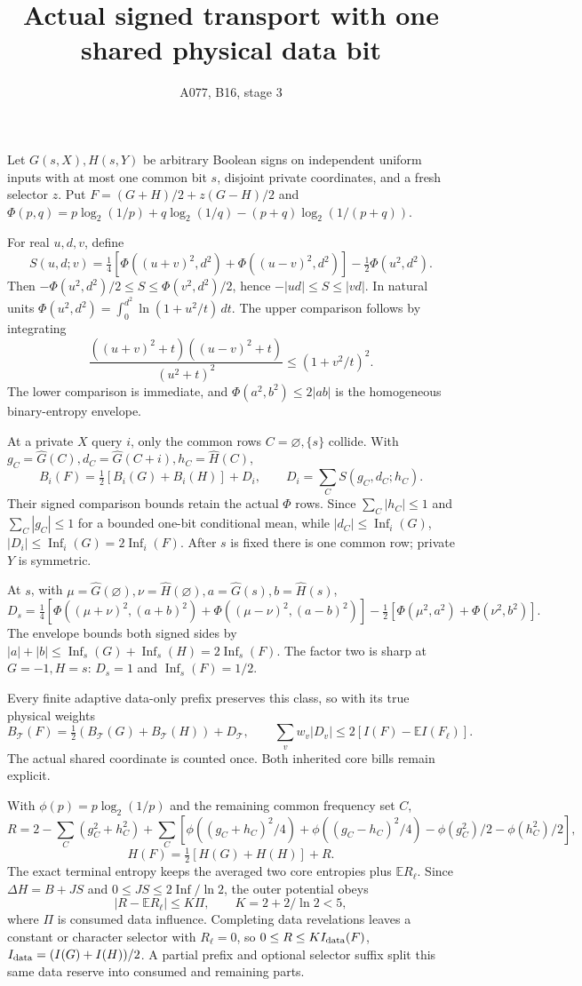 \documentclass{article}
\begin{document}
\title{Actual signed transport with one shared physical data bit}
\author{A077, B16, stage 3}\maketitle
Let $G(s,X),H(s,Y)$ be arbitrary Boolean signs on independent uniform inputs with at most one common bit $s$, disjoint private coordinates, and a fresh selector $z$. Put $F=(G+H)/2+z(G-H)/2$ and $\Phi(p,q)=p\log_2(1/p)+q\log_2(1/q)-(p+q)\log_2(1/(p+q))$.

For real $u,d,v$, define
\[
S(u,d;v)=\tfrac14[\Phi((u+v)^2,d^2)+\Phi((u-v)^2,d^2)]-\tfrac12\Phi(u^2,d^2).
\]
Then $-\Phi(u^2,d^2)/2\le S\le\Phi(v^2,d^2)/2$, hence $-|ud|\le S\le|vd|$. In natural units $\Phi(u^2,d^2)=\int_0^{d^2}\ln(1+u^2/t)\,dt$. The upper comparison follows by integrating
\[
\frac{((u+v)^2+t)((u-v)^2+t)}{(u^2+t)^2}
\le(1+v^2/t)^2.
\]
The lower comparison is immediate, and $\Phi(a^2,b^2)\le2|ab|$ is the homogeneous binary-entropy envelope.

At a private $X$ query $i$, only the common rows $C=\varnothing,\{s\}$ collide. With $g_C=\widehat G(C),d_C=\widehat G(C+i),h_C=\widehat H(C)$,
\[
B_i(F)=\tfrac12[B_i(G)+B_i(H)]+D_i,\qquad D_i=\sum_C S(g_C,d_C;h_C).
\]
Their signed comparison bounds retain the actual $\Phi$ rows. Since $\sum_C|h_C|\le1$ and $\sum_C|g_C|\le1$ for a bounded one-bit conditional mean, while $|d_C|\le\operatorname{Inf}_i(G)$, $|D_i|\le\operatorname{Inf}_i(G)=2\operatorname{Inf}_i(F)$. After $s$ is fixed there is one common row; private $Y$ is symmetric.

At $s$, with $\mu=\widehat G(\varnothing),\nu=\widehat H(\varnothing),a=\widehat G(s),b=\widehat H(s)$,
\[
D_s=\tfrac14[\Phi((\mu+\nu)^2,(a+b)^2)+\Phi((\mu-\nu)^2,(a-b)^2)]
 -\tfrac12[\Phi(\mu^2,a^2)+\Phi(\nu^2,b^2)].
\]
The envelope bounds both signed sides by $|a|+|b|\le\operatorname{Inf}_s(G)+\operatorname{Inf}_s(H)=2\operatorname{Inf}_s(F)$. The factor two is sharp at $G=-1,H=s$: $D_s=1$ and $\operatorname{Inf}_s(F)=1/2$.

Every finite adaptive data-only prefix preserves this class, so with its true physical weights
\[
B_{\mathcal T}(F)=\tfrac12(B_{\mathcal T}(G)+B_{\mathcal T}(H))+D_{\mathcal T},
\qquad \sum_vw_v|D_v|\le2[I(F)-\mathbb EI(F_\ell)].
\]
The actual shared coordinate is counted once. Both inherited core bills remain explicit.

With $\phi(p)=p\log_2(1/p)$ and the remaining common frequency set $C$,
\[
R=2-\sum_C(g_C^2+h_C^2)+\sum_C[\phi((g_C+h_C)^2/4)+\phi((g_C-h_C)^2/4)
-\phi(g_C^2)/2-\phi(h_C^2)/2],
\]
\[
H(F)=\tfrac12[H(G)+H(H)]+R.
\]
The exact terminal entropy keeps the averaged two core entropies plus $\mathbb ER_\ell$. Since $\Delta H=B+JS$ and $0\le JS\le2\operatorname{Inf}/\ln2$, the outer potential obeys
\[
|R-\mathbb ER_\ell|\le K\Pi,\qquad K=2+2/\ln2<5,
\]
where $\Pi$ is consumed data influence. Completing data revelations leaves a constant or character selector with $R_\ell=0$, so $0\le R\le K I_{\rm data}(F)$, $I_{\rm data}=(I(G)+I(H))/2$. A partial prefix and optional selector suffix split this same data reserve into consumed and remaining parts.
\end{document}
